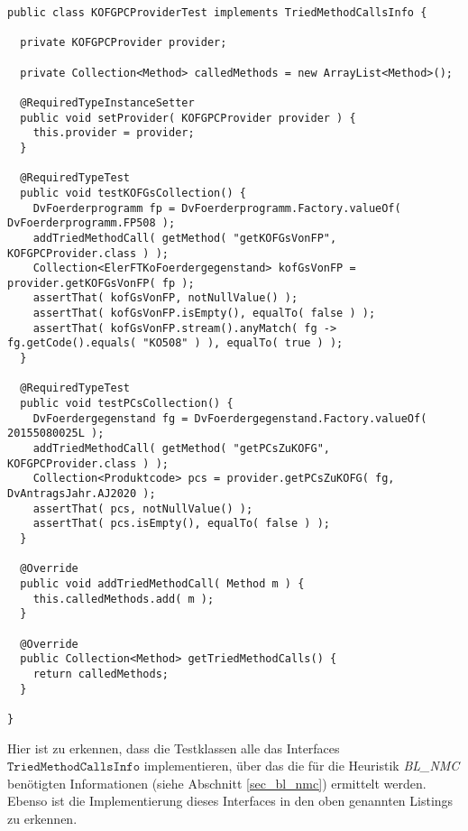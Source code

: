 \begin{lstlisting}[style = java, caption = Interface KOFGPCProviderTest, captionpos = b, label = lst_testklassen_tei7]
public class KOFGPCProviderTest implements TriedMethodCallsInfo {

  private KOFGPCProvider provider;

  private Collection<Method> calledMethods = new ArrayList<Method>();

  @RequiredTypeInstanceSetter
  public void setProvider( KOFGPCProvider provider ) {
    this.provider = provider;
  }

  @RequiredTypeTest
  public void testKOFGsCollection() {
    DvFoerderprogramm fp = DvFoerderprogramm.Factory.valueOf( DvFoerderprogramm.FP508 );
    addTriedMethodCall( getMethod( "getKOFGsVonFP", KOFGPCProvider.class ) );
    Collection<ElerFTKoFoerdergegenstand> kofGsVonFP = provider.getKOFGsVonFP( fp );
    assertThat( kofGsVonFP, notNullValue() );
    assertThat( kofGsVonFP.isEmpty(), equalTo( false ) );
    assertThat( kofGsVonFP.stream().anyMatch( fg -> fg.getCode().equals( "KO508" ) ), equalTo( true ) );
  }

  @RequiredTypeTest
  public void testPCsCollection() {
    DvFoerdergegenstand fg = DvFoerdergegenstand.Factory.valueOf( 20155080025L );
    addTriedMethodCall( getMethod( "getPCsZuKOFG", KOFGPCProvider.class ) );
    Collection<Produktcode> pcs = provider.getPCsZuKOFG( fg, DvAntragsJahr.AJ2020 );
    assertThat( pcs, notNullValue() );
    assertThat( pcs.isEmpty(), equalTo( false ) );
  }

  @Override
  public void addTriedMethodCall( Method m ) {
    this.calledMethods.add( m );
  }

  @Override
  public Collection<Method> getTriedMethodCalls() {
    return calledMethods;
  }

}
\end{lstlisting}
\noindent
Hier ist zu erkennen, dass die Testklassen alle das Interfaces $\texttt{TriedMethodCallsInfo}$ implementieren, über das die für die Heuristik \emph{BL\_NMC} benötigten Informationen (siehe Abschnitt \ref{sec_bl_nmc}) ermittelt werden. Ebenso ist die Implementierung dieses Interfaces in den oben genannten Listings zu erkennen.